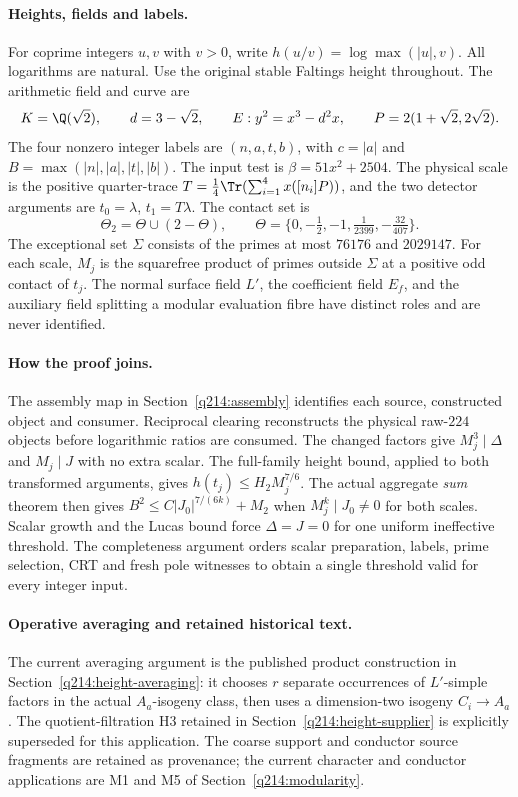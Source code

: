 \paragraph{Heights, fields and labels.}
For coprime integers $u,v$ with $v>0$, write
$h(u/v)=\log\max(|u|,v)$.  All logarithms are natural.  Use the original
stable Faltings height throughout.  The arithmetic field and curve are
\[
 K=\Q(\sqrt2),\qquad d=3-\sqrt2,\qquad
 E:y^2=x^3-d^2x,\qquad P=2(1+\sqrt2,2\sqrt2).
\]
The four nonzero integer labels are $(n,a,t,b)$, with $c=|a|$ and
$B=\max(|n|,|a|,|t|,|b|)$.  The input test is $\beta=51x^2+2504$.
The physical scale is the positive quarter-trace
$T=\frac14\Tr(\sum_{i=1}^4 x([n_i]P))$, and the two detector arguments
are $t_0=\lambda$, $t_1=T\lambda$.  The contact set is
\[
 \Theta_2=\Theta\cup(2-\Theta),\qquad
 \Theta=\{0,-\tfrac12,-1,\tfrac1{2399},-\tfrac{32}{407}\}.
\]
The exceptional set $\Sigma$ consists of the primes at most $76176$ and
$2029147$.  For each scale, $M_j$ is the squarefree product of primes
outside $\Sigma$ at a positive odd contact of $t_j$.
The normal surface field $L'$, the coefficient field $E_f$, and the auxiliary
field splitting a modular evaluation fibre have distinct roles and are never
identified.

\paragraph{How the proof joins.}
The assembly map in Section~\ref{q214:assembly} identifies each source,
constructed object and consumer.  Reciprocal clearing reconstructs the
physical raw-$224$ objects before logarithmic ratios are consumed.  The
changed factors give $M_j^3\mid\Delta$ and $M_j\mid J$ with no extra scalar.
The full-family height bound, applied to both transformed arguments, gives
$h(t_j)\le H_2M_j^{7/6}$.  The actual aggregate \emph{sum} theorem then
gives $B^2\le C|J_0|^{7/(6k)}+M_2$ when $M_j^k\mid J_0\ne0$ for both
scales.  Scalar growth and the Lucas bound force $\Delta=J=0$ for one
uniform ineffective threshold.  The completeness argument orders scalar
preparation, labels, prime selection, CRT and fresh pole witnesses to obtain
a single threshold valid for every integer input.

\paragraph{Operative averaging and retained historical text.}
The current averaging argument is the published product construction in
Section~\ref{q214:height-averaging}: it chooses $r$ separate occurrences of
$L'$-simple factors in the actual $A_a$-isogeny class, then uses a
dimension-two isogeny $C_i\to A_a$.  The quotient-filtration H3 retained
in Section~\ref{q214:height-supplier} is explicitly superseded for this
application.  The coarse support and conductor source fragments are retained
as provenance; the current character and conductor applications are M1 and
M5 of Section~\ref{q214:modularity}.

